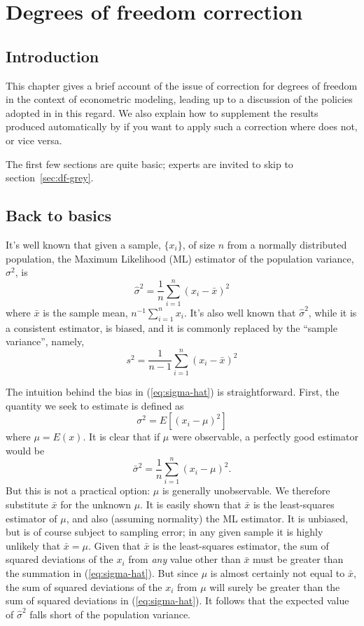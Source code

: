 \chapter{Degrees of freedom correction}
\label{chap:df}


\section{Introduction}

This chapter gives a brief account of the issue of correction for
degrees of freedom in the context of econometric modeling, leading
up to a discussion of the policies adopted in  in this
regard.  We also explain how to supplement the results produced 
automatically by  if you want to apply such a correction
where  does not, or vice versa.

The first few sections are quite basic; experts are invited to skip to
section~\ref{sec:df-grey}.

\section{Back to basics}
\label{sec:df-basics}

It's well known that given a sample, $\{x_i\}$, of size $n$ from a
normally distributed population, the Maximum Likelihood (ML) estimator
of the population variance, $\sigma^2$, is
%
\begin{equation}
\label{eq:sigma-hat}
\hat{\sigma}^2 = \frac{1}{n} \sum_{i=1}^n (x_i - \bar{x})^2
\end{equation}
%
where $\bar{x}$ is the sample mean, $n^{-1} \sum_{i=1}^n x_i$.  It's
also well known that $\hat{\sigma}^2$, while it is a consistent
estimator, is biased, and it is commonly replaced by the ``sample
variance'', namely,
%
\begin{equation}
\label{eq:sample-variance}
s^2 = \frac{1}{n-1} \sum_{i=1}^n (x_i - \bar{x})^2
\end{equation}

The intuition behind the bias in (\ref{eq:sigma-hat}) is
straightforward.  First, the quantity we seek to estimate is defined
as
%
\[
\sigma^2 = E\left[(x_i - \mu)^2\right]
\]
%
where $\mu = E(x)$. It is clear that if $\mu$ were observable, a
perfectly good estimator would be
%
\[
\bar{\sigma}^2 = \frac{1}{n} \sum_{i=1}^n (x_i - \mu)^2.
\]
%
But this is not a practical option: $\mu$ is generally
unobservable. We therefore substitute $\bar{x}$ for the unknown
$\mu$. It is easily shown that $\bar{x}$ is the least-squares
estimator of $\mu$, and also (assuming normality) the ML estimator.
It is unbiased, but is of course subject to sampling error; in any
given sample it is highly unlikely that $\bar{x} = \mu$.  Given that
$\bar{x}$ is the least-squares estimator, the sum of squared
deviations of the $x_i$ from \textit{any} value other than $\bar{x}$
must be greater than the summation in (\ref{eq:sigma-hat}).  But since
$\mu$ is almost certainly not equal to $\bar{x}$, the sum of squared
deviations of the $x_i$ from $\mu$ will surely be greater than the sum
of squared deviations in (\ref{eq:sigma-hat}). It follows that the
expected value of $\hat{\sigma}^2$ falls short of the population
variance.

